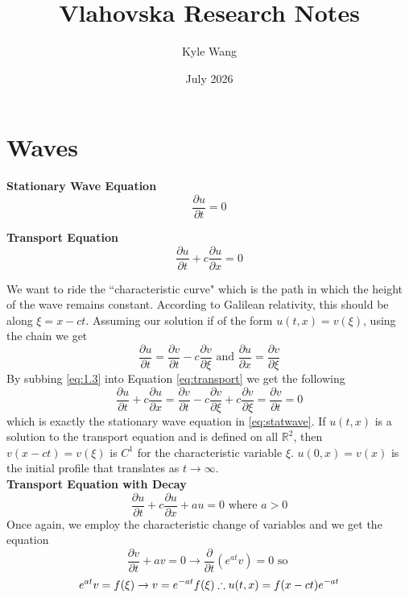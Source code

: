 \documentclass{article}
\title{Vlahovska Research Notes}
\author{Kyle Wang}
\date{July 2026}
\newcommand{\R}{\mathbb{R}}
\newcommand{\pd}[2]{\frac{\partial #1}{\partial #2}}
\numberwithin{equation}{section}
\begin{document}
\maketitle

\tableofcontents 
\section{Waves}
\textbf{Stationary Wave Equation}
\begin{equation}
    \frac{\partial u}{\partial t} = 0 \label{eq:statwave}
\end{equation}

\textbf{Transport Equation}
\begin{equation}
    \frac{\partial u}{\partial t} + c\frac{\partial u}{\partial x} = 0 \label{eq:transport}
\end{equation}

We want to ride the ``characteristic curve" which is the path in which the height of the wave remains constant. According to Galilean relativity, this should be along $\xi = x-ct$. Assuming our solution if of the form $u(t,x) = v(\xi)$, using the chain we get 
\begin{equation}
    \frac{\partial u}{\partial t} = \frac{\partial v}{\partial t} - c\frac{\partial v}{\partial \xi} \text{ and } \frac{\partial u}{\partial x} = \frac{\partial v}{\partial \xi} \label{eq:1.3}
\end{equation}
By subbing \eqref{eq:1.3} into Equation \eqref{eq:transport} we get the following 
\begin{equation*}
    \frac{\partial u}{\partial t} + c\frac{\partial u}{\partial x} = \frac{\partial v}{\partial t} - c\frac{\partial v}{\partial \xi} + c\frac{\partial v}{\partial \xi} = \frac{\partial v}{\partial t} = 0
\end{equation*}
which is exactly the stationary wave equation in \eqref{eq:statwave}. If $u(t,x)$ is a solution to the transport equation and is defined on all $\R^2$, then $v(x-ct) = v(\xi)$ is $C^1$ for the characteristic variable $\xi$. $u(0,x) = v(x)$ is the initial profile that translates as $t \rightarrow \infty$. \\

\textbf{Transport Equation with Decay}
\begin{equation}
    \pd{u}{t} + c \pd{u}{x} + au = 0 \hspace{4pt} \text{where } a>0
\end{equation}
Once again, we employ the characteristic change of variables and we get the equation 
\begin{equation}
    \pd{v}{t} + av = 0 \rightarrow \frac{\partial}{\partial t}(e^{at}v) = 0 \text{ so }
\end{equation}
\begin{equation*}
     \newline
    e^{at}v = f(\xi) \rightarrow v = e^{-at}f(\xi) \therefore u(t,x) = f(x-ct)e^{-at}
\end{equation*}
\end{document}
